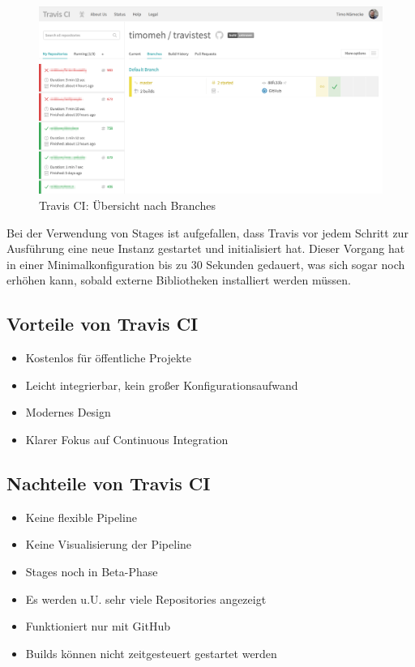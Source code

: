 \begin{figure}[h]
  \caption{Travis CI: Übersicht nach Branches}
  \label{fig:travis-branch}
  \includegraphics[width=.8\textwidth]{assets/travis-branch}
\end{figure}

Bei der Verwendung von Stages ist aufgefallen, dass Travis vor jedem Schritt zur Ausführung eine neue Instanz gestartet und initialisiert hat. Dieser Vorgang hat in einer Minimalkonfiguration bis zu 30 Sekunden gedauert, was sich sogar noch erhöhen kann, sobald externe Bibliotheken installiert werden müssen.

\subsection*{Vorteile von Travis CI}

\begin{itemize}
  \item Kostenlos für öffentliche Projekte
  \item Leicht integrierbar, kein großer Konfigurationsaufwand
  \item Modernes Design
  \item Klarer Fokus auf Continuous Integration
\end{itemize}

\subsection*{Nachteile von Travis CI}

\begin{itemize}
  \item Keine flexible Pipeline
  \item Keine Visualisierung der Pipeline
  \item Stages noch in Beta-Phase
  \item Es werden u.U. sehr viele Repositories angezeigt
  \item Funktioniert nur mit GitHub
  \item Builds können nicht zeitgesteuert gestartet werden
\end{itemize}


